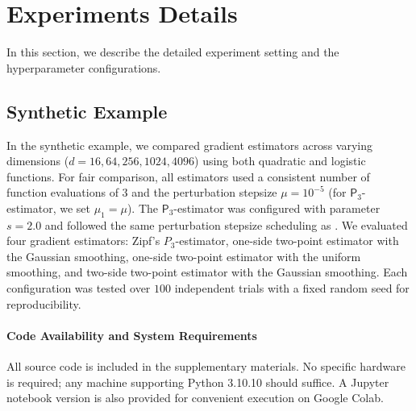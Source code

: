 \documentclass{article}
\newcommand{\EE}{\mathbb{E}}
\newcommand{\RR}{\mathbb{R}}
\theoremstyle{definition}
\theoremstyle{plain}
\newtheorem{lemma}[definition]{Lemma}
\theoremstyle{remark}
\newcommand{\sfP}{\mathsf{P}}
\begin{document}




\section{Experiments Details}\label{appendix:experiments}
In this section, we describe the detailed experiment setting and the hyperparameter configurations.
\subsection{Synthetic Example} 
In the synthetic example, we compared gradient estimators across varying dimensions ($d = 16, 64, 256, 1024, 4096$) using both quadratic and logistic functions. For fair comparison, all estimators used a consistent number of function evaluations of $3$ and the perturbation stepsize $\mu = 10^{-5}$ (for $\sfP_3$-estimator, we set $\mu_1= \mu$). The $\sfP_3$-estimator was configured with parameter $s = 2.0$ and followed the same perturbation stepsize scheduling as . We evaluated four gradient estimators: Zipf's $P_3$-estimator, one-side two-point estimator with the Gaussian smoothing, one-side two-point estimator with the uniform smoothing, and two-side two-point estimator with the Gaussian smoothing. Each configuration was tested over $100$ independent trials with a fixed random seed for reproducibility.  

\paragraph{Code Availability and System Requirements} 
All source code is included in the supplementary materials. No specific hardware is required; any machine supporting Python 3.10.10 should suffice. A Jupyter notebook version is also provided for convenient execution on Google Colab.
\end{document}
